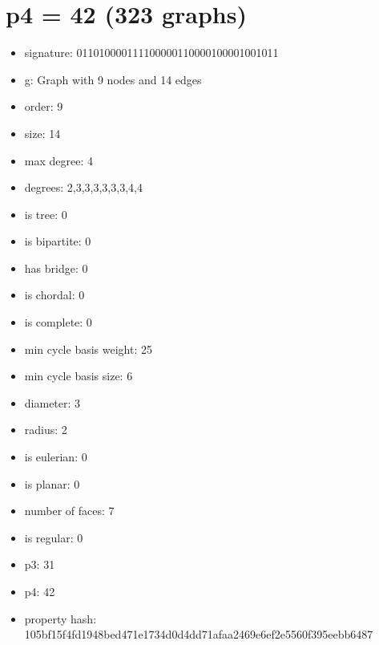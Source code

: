 \chapter{p4 = 42 (323 graphs)}
\newpage\begin{figure}
\end{figure}
\begin{itemize}
\item signature: 011010000111100000110000100001001011
\item g: Graph with 9 nodes and 14 edges
\item order: 9
\item size: 14
\item max degree: 4
\item degrees: 2,3,3,3,3,3,3,4,4
\item is tree: 0
\item is bipartite: 0
\item has bridge: 0
\item is chordal: 0
\item is complete: 0
\item min cycle basis weight: 25
\item min cycle basis size: 6
\item diameter: 3
\item radius: 2
\item is eulerian: 0
\item is planar: 0
\item number of faces: 7
\item is regular: 0
\item p3: 31
\item p4: 42
\item property hash: 105bf15f4fd1948bed471e1734d0d4dd71afaa2469e6ef2e5560f395eebb6487
\end{itemize}
